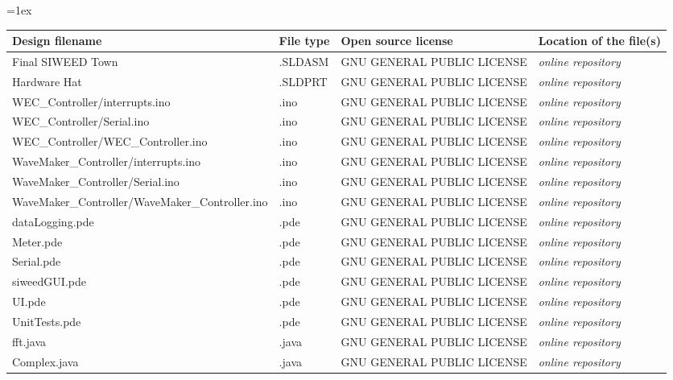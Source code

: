 \documentclass[11pt, letterpaper]{article}
\begin{document}
\tabulinesep=1ex
\begin{tabu} to \linewidth {|X|X|X[1.5,1]|X[1.5,1]|}
\hline
\textbf{Design filename} & \textbf{File type} & \textbf{Open source license} & \textbf{Location of the file(s)} \\\hline
Final SIWEED Town & .SLDASM & GNU GENERAL PUBLIC LICENSE & \textit{online repository} \\\hline
Hardware Hat & .SLDPRT & GNU GENERAL PUBLIC LICENSE & \textit{online repository} \\\hline
WEC\_Controller\slash interrupts.ino & .ino & GNU GENERAL PUBLIC LICENSE& \textit{online repository} \\\hline
WEC\_Controller\slash Serial.ino & .ino & GNU GENERAL PUBLIC LICENSE& \textit{online repository} \\\hline
WEC\_Controller\slash WEC\_Controller.ino & .ino & GNU GENERAL PUBLIC LICENSE& \textit{online repository} \\\hline
WaveMaker\_Controller\slash interrupts.ino & .ino & GNU GENERAL PUBLIC LICENSE& \textit{online repository} \\\hline
WaveMaker\_Controller\slash Serial.ino & .ino & GNU GENERAL PUBLIC LICENSE& \textit{online repository} \\\hline
WaveMaker\_Controller\slash WaveMaker\_Controller.ino & .ino & GNU GENERAL PUBLIC LICENSE& \textit{online repository} \\\hline
dataLogging.pde & .pde& GNU GENERAL PUBLIC LICENSE & \textit{online repository} \\\hline
Meter.pde & .pde& GNU GENERAL PUBLIC LICENSE & \textit{online repository} \\\hline
Serial.pde & .pde& GNU GENERAL PUBLIC LICENSE & \textit{online repository} \\\hline
siweedGUI.pde & .pde& GNU GENERAL PUBLIC LICENSE & \textit{online repository} \\\hline
UI.pde & .pde& GNU GENERAL PUBLIC LICENSE & \textit{online repository} \\\hline
UnitTests.pde & .pde& GNU GENERAL PUBLIC LICENSE & \textit{online repository} \\\hline
fft.java & .java& GNU GENERAL PUBLIC LICENSE & \textit{online repository} \\\hline
Complex.java & .java& GNU GENERAL PUBLIC LICENSE & \textit{online repository} \\\hline
\end{tabu}
\newline
\end{document}
